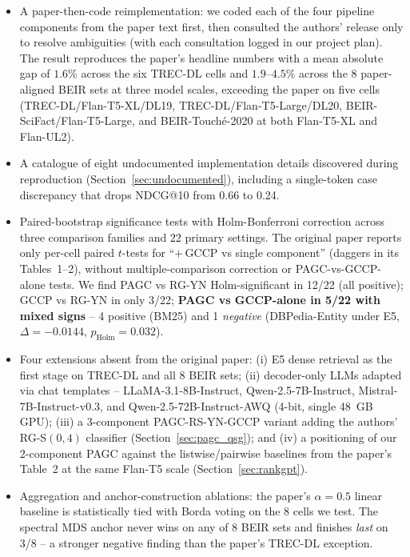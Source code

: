 \documentclass[sigconf]{acmart}
\begin{document}
\begin{itemize}[leftmargin=1.5em,nosep]
    \item A paper-then-code reimplementation: we coded each of the
          four pipeline components from the paper text first, then
          consulted the authors' release only to resolve ambiguities
          (with each consultation logged in our project plan). The
          result reproduces the paper's headline numbers with a
          mean absolute gap of $1.6\%$ across the six TREC-DL cells
          and $1.9$--$4.5\%$ across the 8 paper-aligned BEIR sets
          at three model scales, exceeding the paper on five cells
          (TREC-DL/Flan-T5-XL/DL19, TREC-DL/Flan-T5-Large/DL20,
          BEIR-SciFact/Flan-T5-Large, and BEIR-Touch\'e-2020 at
          both Flan-T5-XL and Flan-UL2).

    \item A catalogue of eight undocumented implementation details
          discovered during reproduction (Section~\ref{sec:undocumented}),
          including a single-token case discrepancy that drops NDCG@10
          from 0.66 to 0.24.

    \item Paired-bootstrap significance tests with Holm-Bonferroni
          correction across three comparison families and 22 primary
          settings. The original paper reports only per-cell paired
          $t$-tests for ``$+$\,GCCP vs single component'' (daggers in
          its Tables~1--2), without multiple-comparison correction or
          PAGC-vs-GCCP-alone tests. We find PAGC vs RG-YN
          Holm-significant in 12/22 (all positive); GCCP vs RG-YN
          in only 3/22; \textbf{PAGC vs GCCP-alone in 5/22 with
          mixed signs} -- 4 positive (BM25) and 1 \emph{negative}
          (DBPedia-Entity under E5, $\Delta{=}{-}0.0144$,
          $p_{\text{Holm}}{=}0.032$).

    \item Four extensions absent from the original paper:
          (i) E5 dense retrieval as the first stage on TREC-DL and
          all 8 BEIR sets; (ii) decoder-only LLMs adapted via chat
          templates -- LLaMA-3.1-8B-Instruct, Qwen-2.5-7B-Instruct,
          Mistral-7B-Instruct-v0.3, and
          Qwen-2.5-72B-Instruct-AWQ (4-bit, single 48~GB GPU);
          (iii) a 3-component PAGC-RS-YN-GCCP variant adding the
          authors' RG-S$(0,4)$ classifier (Section~\ref{sec:pagc_qsg});
          and (iv) a positioning of our 2-component PAGC against the
          listwise/pairwise baselines from the paper's Table~2 at
          the same Flan-T5 scale (Section~\ref{sec:rankgpt}).

    \item Aggregation and anchor-construction ablations: the
          paper's $\alpha{=}0.5$ linear baseline is statistically
          tied with Borda voting on the 8 cells we test. The
          spectral MDS anchor never wins on any of 8 BEIR sets and
          finishes \emph{last} on 3/8 -- a stronger negative
          finding than the paper's TREC-DL exception.
\end{itemize}
\end{document}
